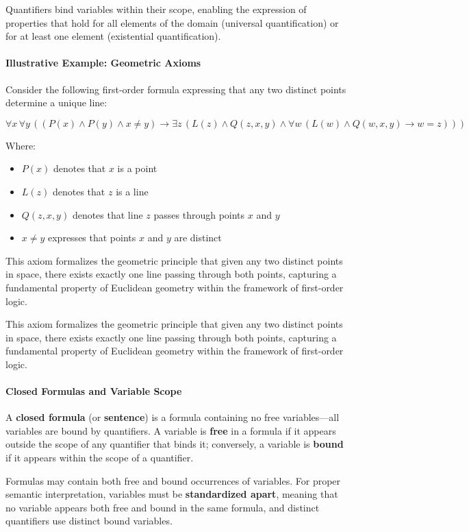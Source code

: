 \documentclass[11pt,a4paper]{article}
\theoremstyle{definition}
\theoremstyle{plain}
\theoremstyle{remark}
\begin{document}
Quantifiers bind variables within their scope, enabling the expression of properties that hold for all elements of the domain (universal quantification) or for at least one element (existential quantification).

\subsection{Illustrative Example: Geometric Axioms}

Consider the following first-order formula expressing that any two distinct points determine a unique line:

\[
\forall x \, \forall y \, \left( (P(x) \wedge P(y) \wedge x \neq y) \rightarrow \exists z \, (L(z) \wedge Q(z, x, y) \wedge \forall w \, (L(w) \wedge Q(w, x, y) \rightarrow w = z)) \right)
\]

Where:
\begin{itemize}
    \item $P(x)$ denotes that $x$ is a point
    \item $L(z)$ denotes that $z$ is a line
    \item $Q(z, x, y)$ denotes that line $z$ passes through points $x$ and $y$
    \item $x \neq y$ expresses that points $x$ and $y$ are distinct
\end{itemize}

This axiom formalizes the geometric principle that given any two distinct points in space, there exists exactly one line passing through both points, capturing a fundamental property of Euclidean geometry within the framework of first-order logic. 

This axiom formalizes the geometric principle that given any two distinct points in space, there exists exactly one line passing through both points, capturing a fundamental property of Euclidean geometry within the framework of first-order logic.

\subsection{Closed Formulas and Variable Scope}

A \textbf{closed formula} (or \textbf{sentence}) is a formula containing no free variables---all variables are bound by quantifiers. A variable is \textbf{free} in a formula if it appears outside the scope of any quantifier that binds it; conversely, a variable is \textbf{bound} if it appears within the scope of a quantifier.

Formulas may contain both free and bound occurrences of variables. For proper semantic interpretation, variables must be \textbf{standardized apart}, meaning that no variable appears both free and bound in the same formula, and distinct quantifiers use distinct bound variables.



\part{}
\end{document}
